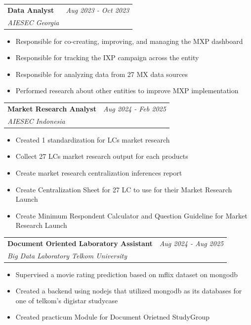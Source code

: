 \documentclass[a4paper,11pt]{article}
\makeatletter
\newcommand{\resumeSubheading}[4]{
\vspace{0.5mm}\item
    \begin{tabular*}{0.98\textwidth}[t]{l@{\extracolsep{\fill}}r}
        \textbf{#1} & \textit{\footnotesize{#4}} \\
        \textit{\footnotesize{#3}} &  \footnotesize{#2}\\
    \end{tabular*}
    \vspace{-2.4mm}
}
\newcommand{\resumeItemListStart}{\begin{justify}\begin{itemize}[leftmargin=3ex, rightmargin=2ex, noitemsep,labelsep=1.2mm,itemsep=0mm]\small}
\newcommand{\resumeItemListEnd}{\end{itemize}\end{justify}\vspace{-2mm}}
\makeatother
\begin{document}
    \vspace{-3.0mm}

    \resumeSubheading
      {Data Analyst}{}
      {AIESEC Georgia}{Aug 2023 - Oct 2023}
      \vspace{-2.0mm}
      
      \resumeItemListStart
    \item {Responsible for co-creating, improving, and managing the MXP dashboard}
    \item {Responsible for tracking the IXP campaign across the entity}
    \item {Responsible for analyzing data from 27 MX data sources}
    \item {Performed research about other entities to improve MXP implementation}
    \resumeItemListEnd
    
    \vspace{-3.0mm}

    \resumeSubheading
      {Market Research Analyst}{}
      {AIESEC Indonesia}{Aug 2024 - Feb 2025}
      \vspace{-2.0mm}
      
      \resumeItemListStart
    \item {Created 1 standardization for LCs market research}
    \item {Collect 27 LCs market research output for each products}
    \item {Create market research centralization inferences report}
    \item {Create Centralization Sheet for 27 LC to use for their Market Research Launch}
    \item {Create Minimum Respondent Calculator and Question Guideline for Market Research Launch}
    \resumeItemListEnd
    
    \vspace{-3.0mm}

        \resumeSubheading
      {Document Oriented Laboratory Assistant}{}
      {Big Data Laboratory Telkom University}{Aug 2024 - Aug 2025}
      \vspace{-2.0mm}

      \resumeItemListStart
      \item{Supervised a movie rating prediction based on mflix dataset on mongodb}
      \item{Created a backend using nodejs that utilized mongodb as its databases for one of telkom's digistar studycase}
      \item {Created practicum Module for Document Orietned StudyGroup}
      \resumeItemListEnd
\end{document}
